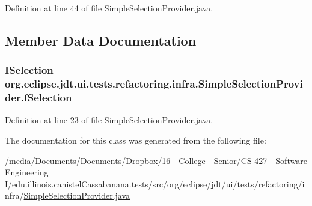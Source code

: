 Definition at line 44 of file SimpleSelectionProvider.java.



\subsection{Member Data Documentation}
\hypertarget{classorg_1_1eclipse_1_1jdt_1_1ui_1_1tests_1_1refactoring_1_1infra_1_1SimpleSelectionProvider_a739d052e4cf4a81791e735fbed1a34db}{
\subsubsection[{fSelection}]{\setlength{\rightskip}{0pt plus 5cm}ISelection {\bf org.eclipse.jdt.ui.tests.refactoring.infra.SimpleSelectionProvider.fSelection}}}
\label{classorg_1_1eclipse_1_1jdt_1_1ui_1_1tests_1_1refactoring_1_1infra_1_1SimpleSelectionProvider_a739d052e4cf4a81791e735fbed1a34db}


Definition at line 23 of file SimpleSelectionProvider.java.



The documentation for this class was generated from the following file:\begin{DoxyCompactItemize}
\item 
/media/Documents/Documents/Dropbox/16 -\/ College -\/ Senior/CS 427 -\/ Software Engineering I/edu.illinois.canistelCassabanana.tests/src/org/eclipse/jdt/ui/tests/refactoring/infra/\hyperlink{SimpleSelectionProvider_8java}{SimpleSelectionProvider.java}\end{DoxyCompactItemize}
